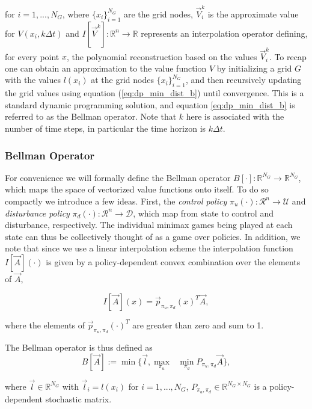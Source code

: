 \documentclass{journal}
\newcommand{\D}{\mathcal{D}}
\newcommand{\R}{\mathcal{R}}
\newcommand{\U}{\mathcal{U}}
\newcommand{\RR}{\mathbb{R}}
\begin{document}
\noindent for  $i=1, ..., N_G$, where $\{x_i\}_{i=1}^{N_G}$ are the grid nodes, $\vec{V}_i^k$ is the approximate value for $V(x_i, k \Delta t)$ and $I[\vec{V}^k]:\RR^n \rightarrow \RR$ represents an interpolation operator defining, for every point $x$, the polynomial reconstruction based on the values $\vec{V}_i^k$. To recap one can obtain an approximation to the value function $V$ by initializing a grid $G$ with the values $l(x_i)$ at the grid nodes $\{x_i\}_{i=1}^{N_G}$, and then recursively updating the grid values using equation (\ref{eq:dp_min_dist_b}) until convergence. This is a standard dynamic programming solution, and equation \ref{eq:dp_min_dist_b} is referred to as the Bellman operator. Note that $k$ here is associated with the number of time steps, in particular the time horizon is $k \Delta t$.

\subsubsection{Bellman Operator}
For convenience we will formally define the Bellman operator $B[\cdot]: \RR^{N_G} \rightarrow \RR^{N_G}$, which maps the space of vectorized value functions onto itself. To do so compactly we introduce a few ideas. First, the \emph{control policy} $\pi_u(\cdot): \R^n \rightarrow \U$ and \emph{disturbance policy} $\pi_d(\cdot): \R^n \rightarrow \D$, which map from state to control and disturbance, respectively. The individual minimax games being played at each state can thus be collectively thought of as a game over policies. In addition, we note that since we use a linear interpolation scheme the interpolation function $I[\vec{A}](\cdot)$ is given by a policy-dependent convex combination over the elements of $\vec{A}$,

\begin{equation}
I[\vec{A}](x)= \vec{p}_{\pi_u,\pi_d}(x)^T \vec{A},
\end{equation}

\noindent where the elements of $\vec{p}_{\pi_u,\pi_d}(\cdot)^T$ are greater than zero and sum to 1. 

The Bellman operator is thus defined as 
\begin{equation} \label{eq:bell}
 B[\vec{A}] := \min\{\vec{l},  \underset{\pi_u}{\max}\text{ }\underset{ \pi_d}{\min} P_{\pi_u, \pi_d} \vec{A}\},
\end{equation}

\noindent where $\vec{l} \in \RR^{N_G}$ with $\vec{l}_i = l(x_i)$ for $i=1, ..., N_G$, $P_{\pi_u, \pi_d} \in \RR^{N_G \times N_G}$ is a policy-dependent stochastic matrix.
\end{document}
